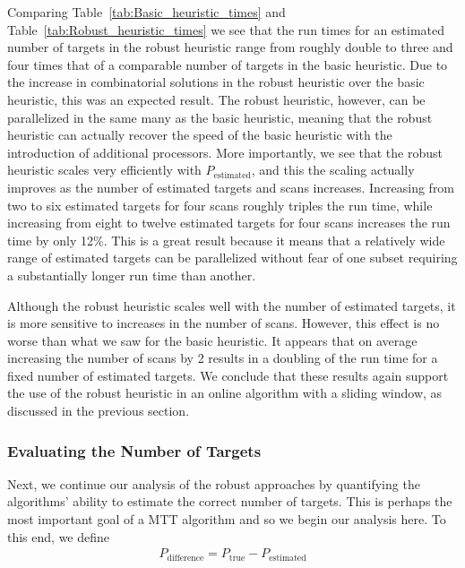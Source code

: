 \documentclass[journal]{IEEEtran}
\begin{document}
Comparing Table~\ref{tab:Basic_heuristic_times} and Table~\ref{tab:Robust_heuristic_times} we see that the run times for an estimated number of targets in the robust heuristic range from roughly double to three and four times that of a comparable number of targets in the basic heuristic. Due to the increase in combinatorial solutions in the robust heuristic over the basic heuristic, this was an expected result. The robust heuristic, however, can be parallelized in the same many as the basic heuristic, meaning that the robust heuristic can actually recover the speed of the basic heuristic with the introduction of additional processors. More importantly, we see that the robust heuristic scales very efficiently with $P_{\text{estimated}}$, and this the scaling actually improves as the number of estimated targets and scans increases. Increasing from two to six estimated targets for four scans roughly triples the run time, while increasing from eight to twelve estimated targets for four scans increases the run time by only 12\%. This is a great result because it means that a relatively wide range of estimated targets can be parallelized without fear of one subset requiring a substantially longer run time than another. 

Although the robust heuristic scales well with the number of estimated targets, it is more sensitive to increases in the number of scans. However, this effect is no worse than what we saw for the basic heuristic. It appears that on average increasing the number of scans by 2 results in a doubling of the run time for a fixed number of estimated targets. We conclude that these results again support the use of the robust heuristic in an online algorithm with a sliding window, as discussed in the previous section.
 
\subsubsection{Evaluating the Number of Targets}
Next, we continue our analysis of the robust approaches by quantifying the algorithms' ability to estimate the correct number of targets. This is perhaps the most important goal of a MTT algorithm and so we begin our analysis here. To this end, we define
\begin{align}
	P_{\text{difference}} = P_{\text{true}} - P_{\text{estimated}}
\end{align}
\end{document}
